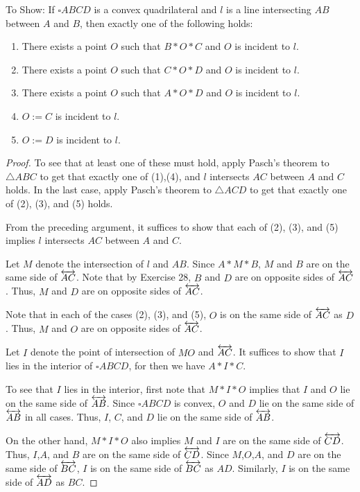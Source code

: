 \documentclass{article}
\begin{document}
 To Show: If $\square ABCD$ is a convex quadrilateral and $l$ is a line intersecting $AB$ between $A$ and $B$, then exactly one of the following holds:
\begin{enumerate}
\item There exists a point $O$ such that $B*O*C$ and $O$ is incident to $l$.
\item There exists a point $O$ such that $C*O*D$ and $O$ is incident to $l$.
\item There exists a point $O$ such that $A*O*D$ and $O$ is incident to $l$.
\item $O := C$ is incident to $l$.
\item $O := D$ is incident to $l$.
\end{enumerate}
\begin{proof}
To see that at least one of these must hold, apply Pasch's theorem to $\triangle ABC$ to get that exactly one of (1),(4), and $l$ intersects $AC$ between $A$ and $C$ holds.  In the last case, apply Pasch's theorem to $\triangle ACD$ to get that exactly one of (2), (3), and (5) holds.

From the preceding argument, it suffices to show that each of (2), (3), and (5) implies $l$ intersects $AC$ between $A$ and $C$. 

Let $M$ denote the intersection of $l$ and $AB$. Since $A*M*B$, $M$ and $B$ are on the same side of $\overleftrightarrow{AC}$. Note that by Exercise 28, $B$ and $D$ are on opposite sides of $\overleftrightarrow{AC}$. Thus, $M$ and $D$ are on opposite sides of $\overleftrightarrow{AC}$.

Note that in each of the cases (2), (3), and (5), $O$ is on the same side of $\overleftrightarrow{AC}$ as $D$. Thus, $M$ and $O$ are on opposite sides of $\overleftrightarrow{AC}$.

Let $I$ denote the point of intersection of $MO$ and $\overleftrightarrow{AC}$. It suffices to show that $I$ lies in the interior of $\square ABCD$, for then we have $A*I*C$.  

To see that $I$ lies in the interior, first note that $M * I * O$ implies that $I$ and $O$ lie on the same side of $\overleftrightarrow{AB}$. Since $\square ABCD$ is convex, $O$ and $D$ lie on the same side of $\overleftrightarrow{AB}$ in all cases. Thus, $I$, $C$, and $D$ lie on the same side of $\overleftrightarrow{AB}$. 

On the other hand, $M*I*O$ also implies $M$ and $I$ are on the same side of $\overleftrightarrow{CD}$. Thus, $I$,$A$, and $B$ are on the same side of $\overleftrightarrow{CD}$.  Since $M$,$O$,$A$, and $D$ are on the same side of $\overleftrightarrow{BC}$, $I$ is on the same side of $\overleftrightarrow{BC}$ as $AD$.  Similarly, $I$ is on the same side of $\overleftrightarrow{AD}$ as $BC$.  


\end{proof}
\end{document}
